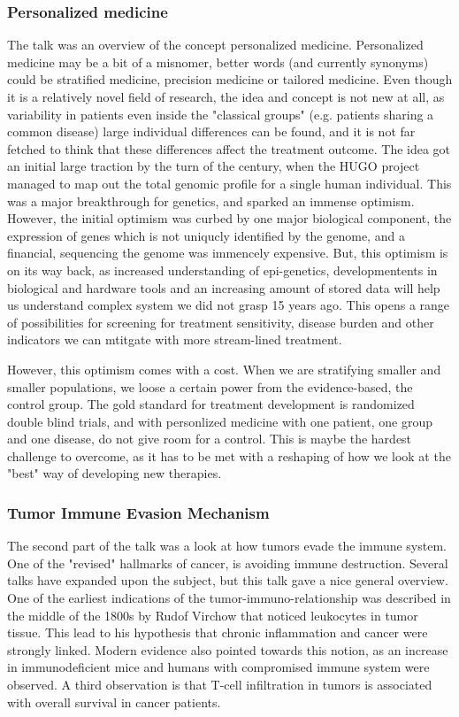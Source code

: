 \documentclass[12p]{article}
\begin{document}
\subsubsection{Personalized medicine}

The talk was an overview of the concept personalized medicine.
Personalized medicine may be a bit of a misnomer, better words (and currently synonyms) could be stratified medicine, precision medicine or tailored medicine.
Even though it is a relatively novel field of research, the idea and concept is not new at all, as variability in patients even inside the "classical groups" (e.g. patients sharing a common disease) large individual differences can be found, and it is not far fetched to think that these differences affect the treatment outcome.
The idea got an initial large traction by the turn of the century, when the HUGO project managed to map out the total genomic profile for a single human individual.
This was a major breakthrough for genetics, and sparked an immense optimism.
However, the initial optimism was curbed by one major biological component, the expression of genes which is not uniqucly identified by the genome, and a financial, sequencing the genome was immencely expensive.
But, this optimism is on its way back, as increased understanding of epi-genetics, developmentents in biological and hardware tools and an increasing amount of stored data will help us understand complex system we did not grasp 15 years ago.
This opens a range of possibilities for screening for treatment sensitivity, disease burden and other indicators we can mtitgate with more stream-lined treatment.

However, this optimism comes with a cost.
When we are stratifying smaller and smaller populations, we loose a certain power from the evidence-based, the control group.
The gold standard for treatment development is randomized double blind trials, and with personlized medicine with one patient, one group and one disease, do not give room for a control.
This is maybe the hardest challenge to overcome, as it has to be met with a reshaping of how we look at the "best" way of developing new therapies.

\subsubsection{Tumor Immune Evasion Mechanism}

The second part of the talk was a look at how tumors evade the immune system.
One of the "revised" hallmarks of cancer, is avoiding immune destruction.
Several talks have expanded upon the subject, but this talk gave a nice general overview.
One of the earliest indications of the tumor-immuno-relationship was described in the middle of the 1800s by Rudof Virchow that noticed leukocytes in tumor tissue.
This lead to his hypothesis that chronic inflammation and cancer were strongly linked.
Modern evidence also pointed towards this notion, as an increase in immunodeficient mice and humans with compromised immune system were observed.
A third observation is that T-cell infiltration in tumors is associated with overall survival in cancer patients.
\end{document}
